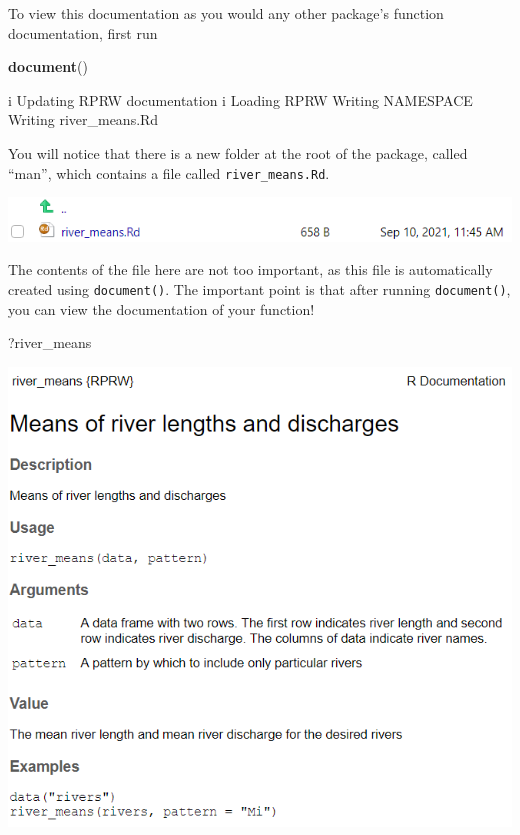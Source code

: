 \documentclass[
]{book}
\newenvironment{Shaded}{\begin{snugshade}}{\end{snugshade}}
\newcommand{\KeywordTok}[1]{\textcolor[rgb]{0.13,0.29,0.53}{\textbf{#1}}}
\newcommand{\NormalTok}[1]{#1}
\begin{document}
To view this documentation as you would any other package's function documentation, first run

\begin{Shaded}
\begin{Highlighting}[]
\KeywordTok{document}\NormalTok{()}
\end{Highlighting}
\end{Shaded}

\begin{Shaded}
\begin{Highlighting}[]
\NormalTok{i Updating RPRW documentation}
\NormalTok{i Loading RPRW}
\NormalTok{Writing NAMESPACE}
\NormalTok{Writing river_means.Rd}
\end{Highlighting}
\end{Shaded}

You will notice that there is a new folder at the root of the package, called ``man'', which contains a file called \texttt{river\_means.Rd}.

\includegraphics[width=1\linewidth]{images/newrpack_files2}

The contents of the file here are not too important, as this file is automatically created using \texttt{document()}. The important point is that after running \texttt{document()}, you can view the documentation of your function!

\begin{Shaded}
\begin{Highlighting}[]
\NormalTok{?river_means}
\end{Highlighting}
\end{Shaded}

\includegraphics[width=1\linewidth]{images/newrpack_example}
\end{document}
